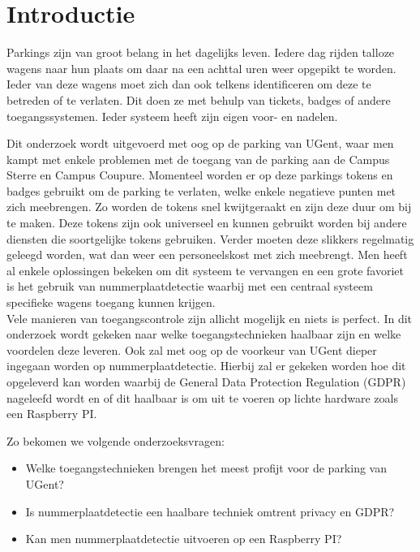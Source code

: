 
\section{Introductie} %
\label{sec:introductie}

Parkings zijn van groot belang in het dagelijks leven. Iedere dag rijden talloze wagens naar hun plaats om daar na een achttal uren weer opgepikt te worden. Ieder van deze wagens moet zich dan ook telkens identificeren om deze te betreden of te verlaten. Dit doen ze met behulp van tickets, badges of andere toegangssystemen. Ieder systeem heeft zijn eigen voor- en nadelen.

Dit onderzoek wordt uitgevoerd met oog op de parking van UGent, waar men kampt met enkele problemen met de toegang van de parking aan de Campus Sterre en Campus Coupure. Momenteel worden er op deze parkings tokens en badges gebruikt om de parking te verlaten, welke enkele negatieve punten met zich meebrengen. Zo worden de tokens snel kwijtgeraakt en zijn deze duur om bij te maken. Deze tokens zijn ook universeel en kunnen gebruikt worden bij andere diensten die soortgelijke tokens gebruiken. Verder moeten deze slikkers regelmatig geleegd worden, wat dan weer een personeelskost met zich meebrengt. Men heeft al enkele oplossingen bekeken om dit systeem te vervangen en een grote favoriet is het gebruik van nummerplaatdetectie waarbij met een centraal systeem specifieke wagens toegang kunnen krijgen.
\\
Vele manieren van toegangscontrole zijn allicht mogelijk en niets is perfect. In dit onderzoek wordt gekeken naar welke toegangstechnieken haalbaar zijn en welke voordelen deze leveren. Ook zal met oog op de voorkeur van UGent dieper ingegaan worden op nummerplaatdetectie. Hierbij zal er gekeken worden hoe dit opgeleverd kan worden waarbij de General Data Protection Regulation (GDPR) nageleefd wordt en of dit haalbaar is om uit te voeren op lichte hardware zoals een Raspberry PI.

Zo bekomen we volgende onderzoeksvragen:
\begin{itemize}
	\item Welke toegangstechnieken brengen het meest profijt voor de parking van UGent?
	\item Is nummerplaatdetectie een haalbare techniek omtrent privacy en GDPR?
	\item Kan men nummerplaatdetectie uitvoeren op een Raspberry PI?
\end{itemize}

